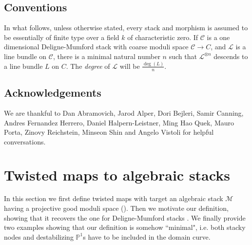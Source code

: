 \documentclass{amsart}
\newcommand{\bP}{\mathbb{P}}
\newcommand{\cC}{\mathcal{C}}
\newcommand{\cL}{\mathcal{L}}
\newcommand{\cM}{\mathcal{M}}
\theoremstyle{definition}
\begin{document}
\subsection*{Conventions} 
In what follows, unless otherwise stated, every stack and morphism is assumed to be essentially of finite type over a field $k$ of characteristic zero. If $\cC$ is a one dimensional Deligne-Mumford stack with coarse moduli space $\cC\to C$, and $\cL$ is a line bundle on $\cC$, there is a minimal natural number $n$ such that $\cL^{\otimes n}$ descends to a line bundle $L$ on $C$. The \textit{degree} of $\cL$ will be $\frac{\operatorname{deg}(L)}{n}$.

\subsection*{Acknowledgements} We are thankful to Dan Abramovich, Jarod Alper, Dori Bejleri, Samir Canning, Andres Fernandez Herrero, Daniel Halpern-Leistner, Ming Hao Quek, Mauro Porta, Zinovy Reichstein, Minseon Shin and Angelo Vistoli for helpful conversations.  

\section{Twisted maps to algebraic stacks}\label{section def}
In this section we first define twisted maps with target an algebraic stack $\cM$ having a projective good moduli space (). Then we motivate our definition, showing that it recovers the one for Deligne-Mumford stacks \cites{AV_compactifying}. We finally provide two examples showing that our definition is somehow ``minimal", i.e. both stacky nodes and destabilizing $\bP^1$s have to be included in the domain curve.
\end{document}
